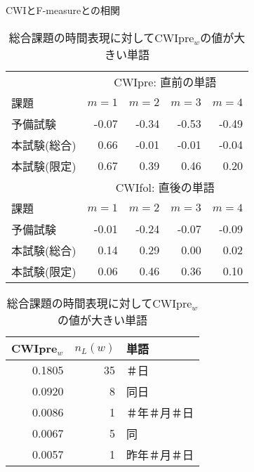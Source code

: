 \begin{table}[tbp]\small
\caption{\label{table:index_CC_CWI}CWIとF-measureとの相関}
\begin{center}
\begin{tabular}{|l||rrrr|} \hline
           & \multicolumn{4}{|c|}{CWIpre: 直前の単語} \\ \cline{2-5} 
課題        & \(m=1\) & \(m=2\) & \(m=3\) & \(m=4\) \\ \hline \hline
予備試験      &   -0.07 &   -0.34 &   -0.53 &   -0.49 \\ \hline
本試験(総合)  &    0.66 &   -0.01 &   -0.01 &   -0.04 \\ \hline
本試験(限定)  &    0.67 &    0.39 &    0.46 &    0.20 \\ \hline \hline
           & \multicolumn{4}{|c|}{CWIfol: 直後の単語} \\ \cline{2-5} 
課題        & \(m=1\) & \(m=2\) & \(m=3\) & \(m=4\) \\ \hline \hline
予備試験      &   -0.01 &   -0.24 &   -0.07 &   -0.09 \\ \hline
本試験(総合)  &    0.14 &    0.29 &    0.00 &    0.02 \\ \hline
本試験(限定)  &    0.06 &    0.46 &    0.36 &    0.10 \\ \hline
\end{tabular}
\end{center}
\caption{\label{table:timeCWIpres}総合課題の時間表現に対してCWIpre$_w$の値が大きい単語}
\begin{center}
\begin{tabular}{|r|r|l|} \hline
CWIpre$_w$ & \(n_L(w)\) & 単語 \\ \hline \hline
0.1805 &   35 &         ＃日 \\ \hline
0.0920 &    8 &         同日 \\ \hline
0.0086 &    1 & ＃年＃月＃日 \\ \hline
0.0067 &    5 &           同 \\ \hline
0.0057 &    1 & 昨年＃月＃日 \\ \hline
\end{tabular}
\end{center}


\end{table}
